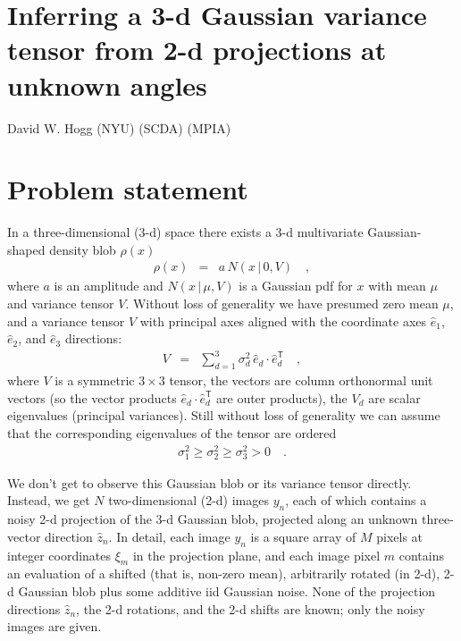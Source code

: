 \documentclass[12pt]{article}
\newcommand{\normal}{N}
\newcommand{\unitvec}[1]{\hat{#1}}
\newcommand{\ehat}{\unitvec{e}}
\newcommand{\zhat}{\unitvec{z}}
\newcommand{\transpose}{^{\mathsf{T}}}
\newcommand{\given}{\,|\,}
\begin{document}
\section*{Inferring a 3-d Gaussian variance tensor from 2-d projections at unknown angles}
\noindent
David W. Hogg (NYU) (SCDA) (MPIA)

\bigskip

\section{Problem statement}

In a three-dimensional (3-d) space there exists a 3-d multivariate
Gaussian-shaped density blob $\rho(x)$
\begin{eqnarray}
  \rho(x) &=& a\,\normal(x\given 0, V)
  \quad ,
\end{eqnarray}
where $a$ is an amplitude and $\normal(x\given\mu, V)$ is a Gaussian
pdf for $x$ with mean $\mu$ and variance tensor $V$.
Without loss of generality we have presumed zero mean $\mu$, and a
variance tensor $V$ with principal axes aligned with the coordinate
axes $\ehat_1$, $\ehat_2$, and $\ehat_3$ directions:
\begin{eqnarray}
  V &=& \sum_{d=1}^3 \sigma^2_d \, \ehat_d\cdot\ehat_d\transpose
  \quad ,
\end{eqnarray}
where $V$ is a symmetric $3\times3$ tensor, the vectors are column
orthonormal unit vectors (so the vector products
$\ehat_d\cdot\ehat_d\transpose$ are outer products), the $V_d$ are
scalar eigenvalues (principal variances).
Still without loss of generality we can assume that the corresponding
eigenvalues of the tensor are ordered
\begin{eqnarray}
  \sigma^2_1 \geq \sigma^2_2 \geq \sigma^2_3 > 0
  \quad .
\end{eqnarray}

We don't get to observe this Gaussian blob or its variance tensor
directly.
Instead, we get $N$ two-dimensional (2-d) images $y_n$, each of which
contains a noisy 2-d projection of the 3-d Gaussian blob,
projected along an unknown three-vector direction $\zhat_n$.
In detail, each image $y_n$ is a square array of $M$ pixels at integer
coordinates $\xi_m$ in the projection plane, and each image pixel $m$
contains an evaluation of a shifted (that is, non-zero mean),
arbitrarily rotated (in 2-d), 2-d Gaussian blob plus some additive iid
Gaussian noise.
None of the projection directions $\zhat_n$, the 2-d rotations, and
the 2-d shifts are known; only the noisy images are given.
\end{document}
